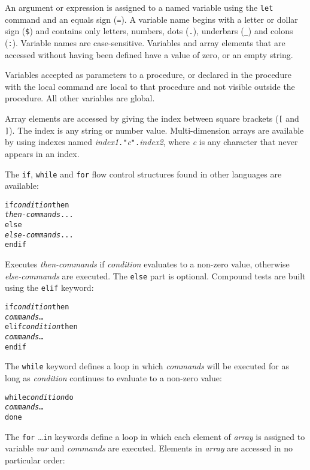 An argument or expression is assigned to a named variable using the
\texttt{let} command and an equals sign (\texttt{=}).  A variable name begins
with a letter or dollar sign (\texttt{\$}) and contains only letters, numbers,
dots (\texttt{.}), underbars (\texttt{\_}) and colons (\texttt{:}).
Variable names are
case-sensitive.  Variables and array elements that are accessed without having
been defined have a value of zero, or an empty string.

Variables accepted as parameters to a procedure, or declared in the procedure
with the local command are local to that procedure and not visible outside the
procedure.  All other variables are global.

Array elements are accessed by giving the index between
square brackets (\texttt{[} and \texttt{]}).
The index is any string or number value.
Multi-dimension arrays are available by using
indexes named \textit{index1}\texttt{."}\textit{c}\texttt{".}\textit{index2},
where \textit{c} is any character that never appears in an index.

The \texttt{if}, \texttt{while} and \texttt{for}
flow control structures
found in other languages are available:

\begin{alltt}
if \textit{condition} then
  \textit{then-commands} ...
else
  \textit{else-commands} ...
endif
\end{alltt}

Executes \textit{then-commands} if \textit{condition} evaluates to
a non-zero value, otherwise \textit{else-commands} are executed.
The \texttt{else} part is optional.
Compound tests are built using the \texttt{elif} keyword:

\begin{alltt}
if \textit{condition} then
  \textit{commands} \dots
elif \textit{condition} then
  \textit{commands} \dots
endif
\end{alltt}

The \texttt{while} keyword defines a loop in which
\textit{commands} will be executed for as long
as \textit{condition} continues to evaluate to a non-zero value:

\begin{alltt}
while \textit{condition} do
  \textit{commands} \dots
done
\end{alltt}

The \texttt{for} \dots \texttt{in} keywords define a loop in which
each element of \textit{array} is assigned to variable \textit{var}
and \textit{commands} are executed.
Elements in \textit{array} are accessed in no particular order:

